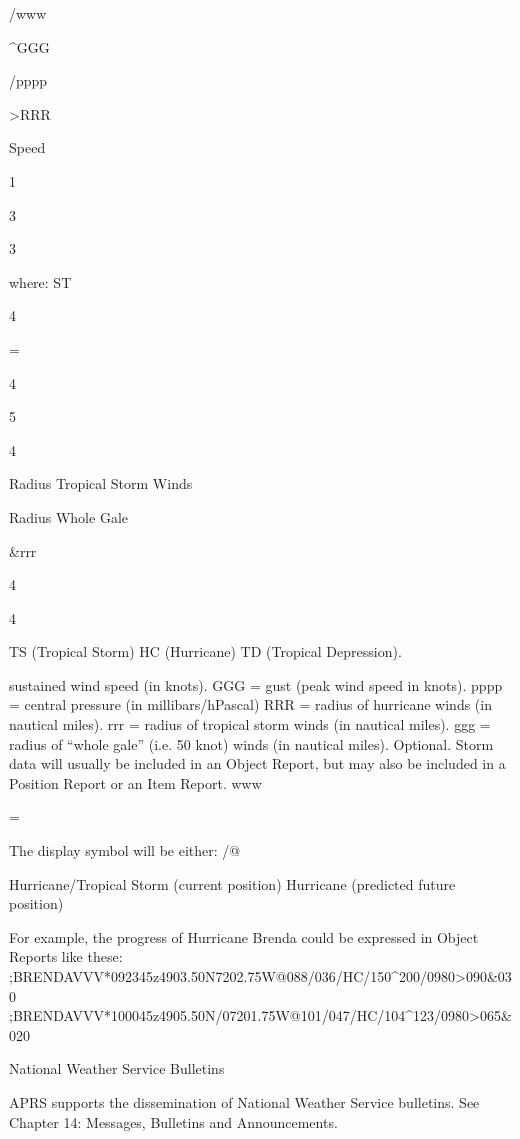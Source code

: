 /www

^GGG

/pppp

>RRR

Speed

1

3

3

where: ST

4

=

4

5

4

Radius
Tropical
Storm
Winds

Radius
Whole
Gale

&rrr


4

4

TS (Tropical Storm)
HC (Hurricane)
TD (Tropical Depression).

sustained wind speed (in knots).
GGG = gust (peak wind speed in knots).
pppp = central pressure (in millibars/hPascal)
RRR = radius of hurricane winds (in nautical miles).
rrr = radius of tropical storm winds (in nautical miles).
ggg = radius of “whole gale” (i.e. 50 knot) winds (in
nautical miles). Optional.
Storm data will usually be included in an Object Report, but may also be
included in a Position Report or an Item Report.
www

=

The display symbol will be either:
\@
/@

Hurricane/Tropical Storm (current position)
Hurricane (predicted future position)

For example, the progress of Hurricane Brenda could be expressed in Object
Reports like these:
;BRENDAVVV*092345z4903.50N\07202.75W@088/036/HC/150^200/0980>090&030%
;BRENDAVVV*100045z4905.50N/07201.75W@101/047/HC/104^123/0980>065&020%

National Weather
Service Bulletins

APRS supports the dissemination of National Weather Service bulletins. See
Chapter 14: Messages, Bulletins and Announcements.




